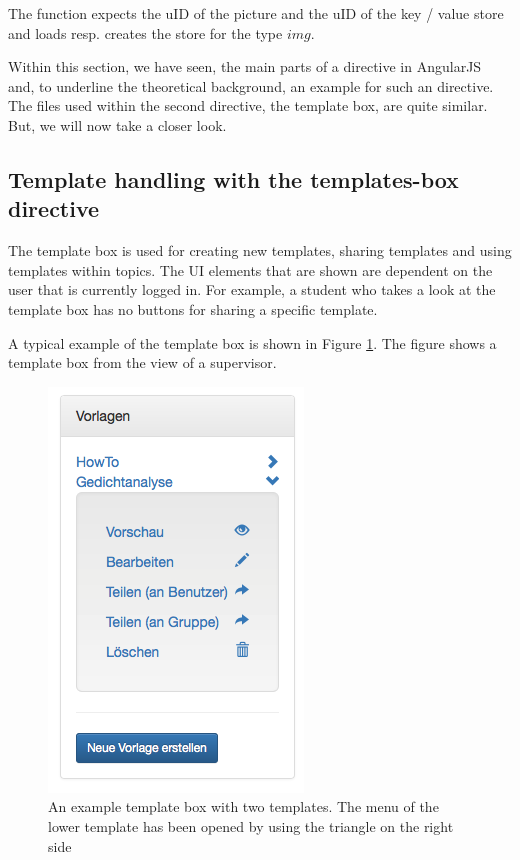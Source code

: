 The function expects the uID of the picture and the uID of the key / value store and loads resp. creates the store for the type $img$.

Within this section, we have seen, the main parts of a directive in AngularJS and, to underline the theoretical background, an example for such an directive.
The files used within the second directive, the template box, are quite similar. But, we will now take a closer look.

\subsection{Template handling with the templates-box directive}
The template box is used for creating new templates, sharing templates and using templates within topics. The \ac{UI} elements that are shown are dependent on the user that is currently logged in. For example, a student who takes a look at the template box has no buttons for sharing a specific template.

A typical example of the template box is shown in Figure \ref{templateBox}. The figure shows a template box from the view of a supervisor.

\begin{figure}[th]
\centerline{\includegraphics[width=.5\textwidth]{gfx/templateBox}}
\caption{An example template box with two templates. The menu of the lower template has been opened by using the triangle on the right side}
\label{templateBox}
\end{figure}

